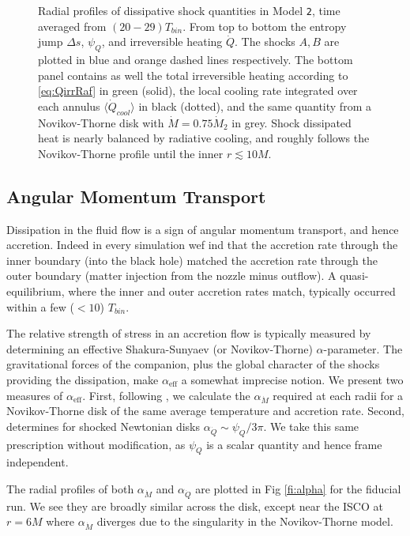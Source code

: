 \documentclass{emulateapj}
\newcommand{\al}{\alpha}
\newcommand{\De}{\Delta}
\newcommand{\model}[1]{{Model \texttt{#1}}}
\newcommand{\avet}[1]{ \langle #1 \rangle}
\begin{document}
\begin{figure}
\caption{\label{fi:diss} Radial profiles of dissipative shock quantities in \model{2}, time averaged from $(20 - 29) T_{bin}$.  From top to bottom the entropy jump $\De s$, $\psi_Q$, and irreversible heating $\dot{Q}$. The shocks $A,B$ are plotted in blue and orange dashed lines respectively.  The bottom panel contains as well the total irreversible heating according to \eqref{eq:QirrRaf} in green (solid), the local cooling rate integrated over each annulus $\avet{\dot{Q}_{cool}}$ in black (dotted), and the same quantity from a Novikov-Thorne disk with $\dot{M} = 0.75 \dot{M}_2$ in grey.  Shock dissipated heat is nearly balanced by radiative cooling, and roughly follows the Novikov-Thorne profile until the inner $r\lesssim 10M$.}
\end{figure}

\subsection{Angular Momentum Transport}
\label{subsec:angmom}

Dissipation in the fluid flow is a sign of angular momentum transport, and hence accretion. Indeed in every simulation wef ind that the accretion rate through the inner boundary (into the black hole) matched the accretion rate through the outer boundary (matter injection from the nozzle minus outflow).  A quasi-equilibrium, where the inner and outer accretion rates match, typically occurred within a few ($<10$) $T_{bin}$. 

The relative strength of stress in an accretion flow is typically measured by determining an effective Shakura-Sunyaev (or Novikov-Thorne) $\al$-parameter.  The gravitational forces of the companion, plus the global character of the shocks providing the dissipation, make $\al_{\text{eff}}$ a somewhat imprecise notion.  We present two measures of $\al_{\text{eff}}$.  First, following \cite{Ju16}, we calculate the $\al_{\dot{M}}$ required at each radii for a Novikov-Thorne disk of the same average temperature and accretion rate.  Second, \cite{Rafikov16} determines for shocked Newtonian disks $\al_{\dot{Q}} \sim \psi_Q / 3\pi$.  We take this same prescription without modification, as $\psi_Q$ is a scalar quantity and hence frame independent.  

The radial profiles of both $\al_{\dot{M}}$ and $\al_{\dot{Q}}$ are plotted in Fig \ref{fi:alpha} for the fiducial run.  We see they are broadly similar across the disk, except near the ISCO at $r=6M$ where $\al_{\dot{M}}$ diverges due to the singularity in the Novikov-Thorne model.
\end{document}
